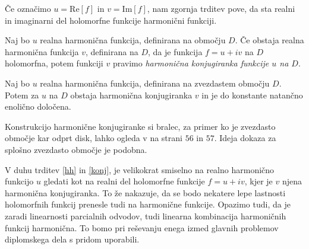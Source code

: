\documentclass[mat1, tisk]{fmfdelo}
\begin{document}
    \begin{opomba}
        Če označimo $u = \text{Re}[f]$ in $v = \text{Im}[f]$, nam zgornja trditev pove, da sta realni in imaginarni del holomorfne funkcije harmonični funkciji. 
    \end{opomba}

    \begin{definicija}
        Naj bo $u$ realna harmonična funkcija, definirana na območju $D$. Če obstaja realna harmonična funkcija $v$, definirana na $D$, da je funkcija $f = u + iv$ na $D$ holomorfna, potem funkciji $v$ pravimo \emph{harmonična konjugiranka funkcije $u$ na $D$}.    
    \end{definicija}

    \begin{trditev}
        \label{konj}
        Naj bo $u$ realna harmonična funkcija, definirana na zvezdastem območju $D$. Potem za $u$ na $D$ obstaja harmonična konjugiranka $v$ in je do konstante natančno enolično določena. 
    \end{trditev}
    \begin{dokaz}
        Konstrukcijo harmonične konjugiranke si bralec, za primer ko je zvezdasto območje kar odprt disk, lahko ogleda v \cite{osnova} na strani $56$ in $57$. 
        Ideja dokaza za splošno zvezdasto območje je podobna. 
    \end{dokaz}

    V duhu trditev \ref{hh} in \ref{konj}, je velikokrat smiselno na realno harmonično funkcijo $u$ gledati kot na realni del holomorfne funkcije $f = u + iv$, kjer je $v$ njena harmonična konjugiranka. To že nakazuje, da se bodo nekatere lepe lastnosti holomorfnih funkcij prenesle tudi na harmonične funkcije.
    Opazimo tudi, da je zaradi linearnosti parcialnih odvodov, tudi linearna kombinacija harmoničnih funkcij harmonična. To bomo pri reševanju enega izmed glavnih problemov diplomskega dela s pridom uporabili.
\end{document}

